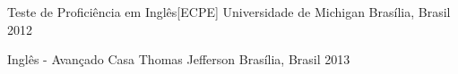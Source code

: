\begin{cvhonors}
  \cvhonor
    {Teste de Proficiência em Inglês[ECPE]}
    {Universidade de Michigan}
    {Brasília, Brasil}
    {2012}
\end{cvhonors}

\begin{cvhonors}
  \cvhonor
    {Inglês - Avançado}
    {Casa Thomas Jefferson}
    {Brasília, Brasil}
    {2013}
\end{cvhonors}
